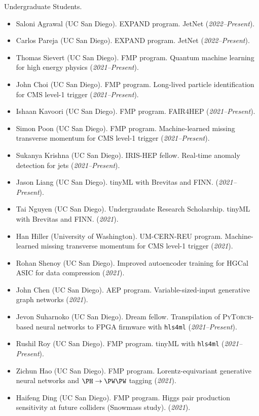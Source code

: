 \documentclass[11pt]{res}
\begin{document}
\begin{resume}
  Undergraduate Students.
  \begin{itemize}
    \itemsep-0.3em
    \item Saloni Agrawal (UC San Diego). EXPAND program. JetNet (\textit{2022--Present}).
    \item Carlos Pareja (UC San Diego). EXPAND program. JetNet (\textit{2022--Present}).
    \item Thomas Sievert (UC San Diego). FMP program. Quantum machine learning for high energy physics (\textit{2021--Present}).
    \item John Choi (UC San Diego). FMP program. Long-lived particle identification for CMS level-1 trigger (\textit{2021--Present}).
    \item Ishaan Kavoori (UC San Diego). FMP program. FAIR4HEP (\textit{2021--Present}).
    \item Simon Poon (UC San Diego). FMP program. Machine-learned missing transverse momentum for CMS level-1 trigger (\textit{2021--Present}).
    \item Sukanya Krishna (UC San Diego). IRIS-HEP fellow. Real-time anomaly detection for jets (\textit{2021--Present}).
    \item Jason Liang (UC San Diego). tinyML with Brevitas and FINN. (\textit{2021--Present}).
    \item Tai Nguyen (UC San Diego). Undergraudate Research Scholarship. tinyML with Brevitas and FINN. (\textit{2021}).
    \item Han Hiller (University of Washington). UM-CERN-REU program. Machine-learned missing transverse momentum for CMS level-1 trigger (\textit{2021}).
    \item Rohan Shenoy (UC San Diego). Improved autoencoder training for HGCal ASIC for data compression (\textit{2021}).
    \item John Chen (UC San Diego). AEP program. Variable-sized-input generative graph networks (\textit{2021}).
    \item Jevon Suharnoko (UC San Diego). Dream fellow. Transpilation of \textsc{PyTorch}-based neural networks to FPGA firmware with \texttt{hls4ml} (\textit{2021--Present}).
    \item Rushil Roy (UC San Diego). FMP program. tinyML with \texttt{hls4ml} (\textit{2021--Present}).
    \item Zichun Hao (UC San Diego). FMP program. Lorentz-equivariant generative neural networks and $\PH\to\PW\PW$ tagging (\textit{2021}).
    \item Haifeng Ding (UC San Diego). FMP program. Higgs pair production sensitivity at future colliders (Snowmass study). (\textit{2021}).

\end{itemize}
\end{resume}
\end{document}
